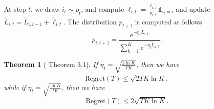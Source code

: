 \documentclass[openany]{book}
\newtheorem{theorem}{Theorem}[chapter]
\theoremstyle{definition}
\theoremstyle{remark}
\begin{document}
At step $t$, we draw $i_t\sim p_t$, and compute $\widetilde{\ell}_{i,t}=\frac{\ell_{i,t}}{p_{i,t}}\mathds{1}_{i_t=i}$ and update $\widetilde{L}_{i,t}=\widetilde{L}_{i,t-1}+\widetilde{\ell}_{i,t}$. The distribution $p_{t+1}$ is computed as follows
\begin{equation}
    p_{i,t+1}=\frac{e^{-\eta_t\widetilde{L}_{i,t}}}{\sum_{k=1}^{K}e^{-\eta_t\widetilde{L}_{k,t}}}.
\end{equation}

\begin{theorem}[\cite{BC12} Theorem 3.1]
    If $\eta_t=\sqrt{\frac{2\ln K}{TK}}$, then we have
    \begin{equation}
        \overline{\mathrm{Regret}(T)}\le\sqrt{2TK\ln K},
    \end{equation}
    while if $\eta_t=\sqrt{\frac{\ln K}{tK}}$, then we have
    \begin{equation}
        \overline{\mathrm{Regret}(T)}\le2\sqrt{TK\ln K}.
    \end{equation}
\end{theorem}



\end{document}
